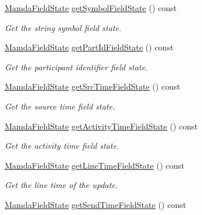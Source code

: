 \begin{CompactItemize}
\hyperlink{namespaceWombat_93aac974f2ab713554fd12a1fa3b7d2a}{Mamda\-Field\-State} \hyperlink{classWombat_1_1MamdaNewsHeadline_3eabde22221b2e826739c8c9a2f40b9f}{get\-Symbol\-Field\-State} () const 
\begin{CompactList}\small\item\em Get the string symbol field state. \item\end{CompactList}\item 
\hyperlink{namespaceWombat_93aac974f2ab713554fd12a1fa3b7d2a}{Mamda\-Field\-State} \hyperlink{classWombat_1_1MamdaNewsHeadline_10f8732e6a2cdcd78b4aa2d538a0d8e0}{get\-Part\-Id\-Field\-State} () const 
\begin{CompactList}\small\item\em Get the participant identifier field state. \item\end{CompactList}\item 
\hyperlink{namespaceWombat_93aac974f2ab713554fd12a1fa3b7d2a}{Mamda\-Field\-State} \hyperlink{classWombat_1_1MamdaNewsHeadline_dcc694fb0275a765150b900a12e0eb83}{get\-Src\-Time\-Field\-State} () const 
\begin{CompactList}\small\item\em Get the source time field state. \item\end{CompactList}\item 
\hyperlink{namespaceWombat_93aac974f2ab713554fd12a1fa3b7d2a}{Mamda\-Field\-State} \hyperlink{classWombat_1_1MamdaNewsHeadline_87fdd5a28a8eb589ea70b255455df57f}{get\-Activity\-Time\-Field\-State} () const 
\begin{CompactList}\small\item\em Get the activity time field state. \item\end{CompactList}\item 
\hyperlink{namespaceWombat_93aac974f2ab713554fd12a1fa3b7d2a}{Mamda\-Field\-State} \hyperlink{classWombat_1_1MamdaNewsHeadline_c89f8f0d4d435a3c4b168a54d6b550be}{get\-Line\-Time\-Field\-State} () const 
\begin{CompactList}\small\item\em Get the line time of the update. \item\end{CompactList}\item 
\hyperlink{namespaceWombat_93aac974f2ab713554fd12a1fa3b7d2a}{Mamda\-Field\-State} \hyperlink{classWombat_1_1MamdaNewsHeadline_fc1ffb1b9bcb412afe19dee561bac49f}{get\-Send\-Time\-Field\-State} () const 

\end{CompactItemize}
